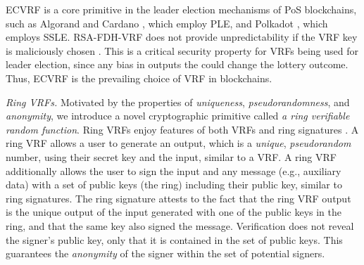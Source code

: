 ECVRF is a core primitive in the leader election mechanisms of PoS blockchains, such as Algorand \cite{ChenM19} and Cardano \cite{KiayiasRDO17,DavidGKR17}, which employ PLE, and Polkadot \cite{BurdgesASV23a}, which employs SSLE.
RSA-FDH-VRF does not provide unpredictability if the VRF key is maliciously chosen \cite{VRF-RFC}. This is a critical security property for VRFs being used for leader election, since any bias in outputs the could change the lottery outcome.  Thus, ECVRF is the prevailing choice of VRF in blockchains.
%
%

\smallskip
\noindent \emph{Ring VRFs.} Motivated by the properties of \emph{uniqueness}, \emph{pseudorandomness}, and \emph{anonymity}, we introduce a novel cryptographic primitive called \emph{a ring verifiable random function}.  Ring VRFs enjoy features of both VRFs \cite{vrf_micali}  and ring signatures \cite{ring_accountable,ring_efficient,ring_linkable,ring_noRO,ring_sublinear}. A ring VRF allows a user to generate an output, which is a \emph{unique}, \emph{pseudorandom} number, using their secret key and the input, similar to a VRF.  A ring VRF additionally allows the user to sign the input and any message (e.g., auxiliary data)  with a set of public keys (the ring) including their public key, similar to ring signatures. The ring signature attests to the fact that the ring VRF output is the unique output of the input generated with one of the public keys in the ring, and that the same key also signed the message. Verification does not reveal the signer's public key, only that it is contained in the set of public keys.
This guarantees the \emph{anonymity} of the signer within the set of potential signers.

